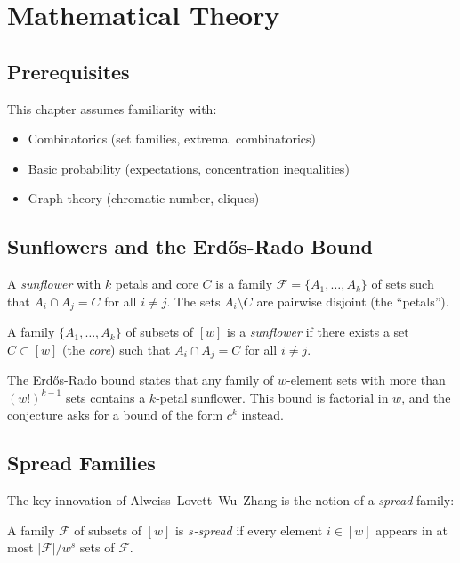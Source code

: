 \section{Mathematical Theory}

\subsection{Prerequisites}
This chapter assumes familiarity with:
\begin{itemize}
\item Combinatorics (set families, extremal combinatorics)
\item Basic probability (expectations, concentration inequalities)
\item Graph theory (chromatic number, cliques)
\end{itemize}

\subsection{Sunflowers and the Erd\H{o}s-Rado Bound}

A \emph{sunflower} with $k$ petals and core $C$ is a family $\mathcal{F} = \{A_1, \ldots, A_k\}$ of sets such that $A_i \cap A_j = C$ for all $i \neq j$. The sets $A_i \setminus C$ are pairwise disjoint (the ``petals'').

\begin{definition}[Sunflower]
A family $\{A_1, \ldots, A_k\}$ of subsets of $[w]$ is a \emph{sunflower} if there exists a set $C \subset [w]$ (the \emph{core}) such that $A_i \cap A_j = C$ for all $i \neq j$.
\end{definition}

The Erd\H{o}s-Rado bound states that any family of $w$-element sets with more than $(w!)^{k-1}$ sets contains a $k$-petal sunflower. This bound is factorial in $w$, and the conjecture asks for a bound of the form $c^k$ instead.

\subsection{Spread Families}

The key innovation of Alweiss--Lovett--Wu--Zhang is the notion of a \emph{spread} family:

\begin{definition}
A family $\mathcal{F}$ of subsets of $[w]$ is \emph{$s$-spread} if every element $i \in [w]$ appears in at most $|\mathcal{F}| / w^s$ sets of $\mathcal{F}$.
\end{definition}

